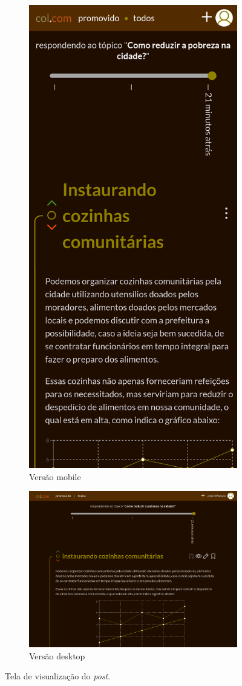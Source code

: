 \begin{figure}[hbt!]
\centering
\begin{subfigure}{.3\textwidth}
  \centering
  \includegraphics[width=.68\linewidth]{imagens/captures/m_post.png}
  \caption{Versão mobile}
\end{subfigure}%
\begin{subfigure}{.7\textwidth}
  \centering
  \includegraphics[width=0.87\linewidth]{imagens/captures/post.png}
  \caption{Versão desktop}
\end{subfigure}
\caption{Tela de visualização do \textit{post}.}
\label{fig:postPage}
\end{figure}



